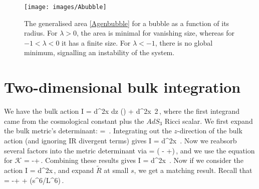 \begin{figure}[h]
\begin{center}
\texttt{[image: images/Abubble]} 
\caption{The generalised area \eqref{Agenbubble} for a bubble as a function of its radius. For $\lambda>0$, the area is minimal for vanishing size, whereas for $-1<\lambda<0$ it has a finite size. For $\lambda<-1$, there is no global minimum, signalling an instability of the system.  }
\label{figAbubble}
\end{center}
\end{figure}


\section{Two-dimensional bulk integration}
We have the bulk action
\beq
I =  \int d^2x dz \Big(\Big) + \int d^2x\, 2\,,
\eeq where the first integrand came from the cosmological constant plus the $AdS_3$ Ricci scalar. We first expand the bulk metric's determinant:
\beq
{} = \,.
\eeq
Integrating out the $z$-direction of the bulk action (and ignoring IR divergent terms) gives
\beq
I = \int d^2x \,.
\eeq
Now we reabsorb several factors into the metric determinant via
\beq
{} = \approx{}\Big( - +\Big)\,,
\eeq and we use the equation for $\mathcal{K}$
\beq
{} = \approx {} -+\,.
\eeq
Combining these results gives
\beq
I = \int d^2x \,.
\eeq
Now if we consider the action
\beq
I = \int d^2x\,,
\eeq and expand $\tilde{R}$ at small $s$, we get a matching result. Recall that
\beq
{} = \approx -+ + (s^6/L^6)\,.
\eeq



